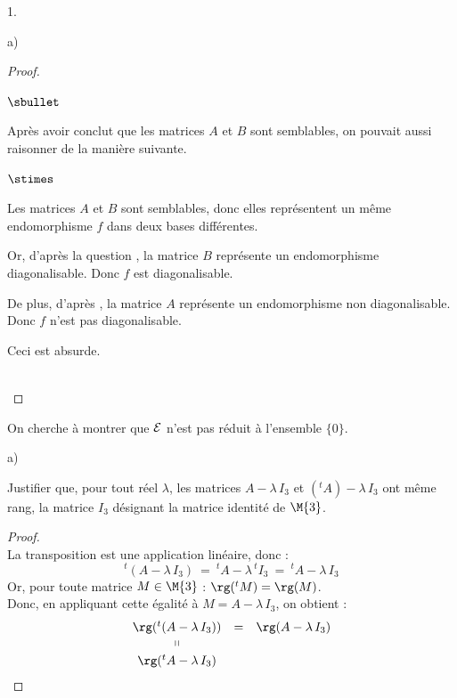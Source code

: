 \documentclass[11pt]{article}%
\begin{document}
\begin{noliste}{1.}
\begin{noliste}{a)}
\begin{proof}
\begin{remark}
\begin{noliste}{$\sbullet$}
	  \item Après avoir conclut que les matrices $A$ et $B$ sont 
	  semblables, on pouvait aussi raisonner de la manière 
	  suivante.
	  \begin{noliste}{$\stimes$}
	    \item Les matrices $A$ et $B$ sont semblables, donc elles 
	    représentent un même endomorphisme $f$ dans deux bases 
	    différentes.
	    \item Or, d'après la question , la matrice 
	    $B$ représente un endomorphisme diagonalisable. Donc $f$
	    est diagonalisable.
	    \item De plus, d'après , la matrice $A$ 
	    représente un endomorphisme non diagonalisable. Donc $f$
	    n'est pas diagonalisable.
	  \end{noliste}
	  Ceci est absurde.
        \end{noliste}
      \end{remark}~\\[-1.4cm]
    \end{proof}
  \end{noliste}
  
  \item On cherche à montrer que ${\cal E}$ n'est pas réduit à 
  l'ensemble $\{0\}$.
  \begin{noliste}{a)}
    \setlength{\itemsep}{2mm}
    \item Justifier que, pour tout réel $\lambda$, les matrices 
    $A-\lambda \, I_3$ et $({}^t A)- \lambda \, I_3$ ont même rang, 
    la matrice $I_3$ désignant la matrice identité de $\M{3}$.
    
    \begin{proof}~\\
      La transposition est une application linéaire, donc :
      \[
        {}^t(A- \lambda \, I_3) \ = \ {}^t A - \lambda \, {}^t I_3
        \ = \ {}^t A - \lambda \, I_3
      \]
      Or, pour toute matrice $M\in \M{3}$ : $\rg({}^t M) = \rg(M)$.\\
      Donc, en appliquant cette égalité à $M= A - \lambda \, I_3$, on 
      obtient :
      \[
       \begin{array}{ccc}
        \rg({}^t (A- \lambda \, I_3)) & = &  \rg(A- \lambda \, I_3)
        \\
        \shortparallel
        \\[.1cm]
        \rg({}^t A - \lambda \, I_3)
       \end{array}
      \]
      

\end{proof}
\end{noliste}
\end{noliste}
\end{document}
